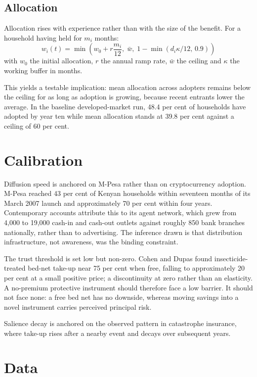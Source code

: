\documentclass[11pt,a4paper]{article}
\begin{document}
\subsection{Allocation}

Allocation rises with experience rather than with the size of the benefit.
For a household having held for $m_i$ months:
\begin{equation}
w_i(t) = \min\!\left(w_0 + r \frac{m_i}{12},\; \bar{w},\;
1 - \min(d_i \kappa / 12,\, 0.9)\right)
\end{equation}
with $w_0$ the initial allocation, $r$ the annual ramp rate, $\bar{w}$ the
ceiling and $\kappa$ the working buffer in months.

This yields a testable implication: mean allocation across adopters remains
below the ceiling for as long as adoption is growing, because recent
entrants lower the average. In the baseline developed-market run, 48.4 per
cent of households have adopted by year ten while mean allocation stands at
39.8 per cent against a ceiling of 60 per cent.

\section{Calibration}

Diffusion speed is anchored on M-Pesa rather than on cryptocurrency
adoption. M-Pesa reached 43 per cent of Kenyan households within seventeen
months of its March 2007 launch and approximately 70 per cent within four
years. Contemporary accounts attribute this to its agent network, which grew
from 4{,}000 to 19{,}000 cash-in and cash-out outlets against roughly 850
bank branches nationally, rather than to advertising. The inference drawn is
that distribution infrastructure, not awareness, was the binding constraint.

The trust threshold is set low but non-zero. Cohen and Dupas found
insecticide-treated bed-net take-up near 75 per cent when free, falling to
approximately 20 per cent at a small positive price; a discontinuity at
zero rather than an elasticity. A no-premium protective instrument should
therefore face a low barrier. It should not face none: a free bed net has no
downside, whereas moving savings into a novel instrument carries perceived
principal risk.

Salience decay is anchored on the observed pattern in catastrophe insurance,
where take-up rises after a nearby event and decays over subsequent years.

\section{Data}
\end{document}
